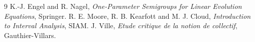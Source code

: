 \documentclass[11pt,a4paper]{article}
\begin{document}
\begin{thebibliography}{9}
 K.-J. Engel and R. Nagel, \emph{One-Parameter Semigroups for Linear Evolution Equations}, Springer.
 R. E. Moore, R. B. Kearfott and M. J. Cloud, \emph{Introduction to Interval Analysis}, SIAM.
 J. Ville, \emph{Etude critique de la notion de collectif}, Gauthier-Villars.
\end{thebibliography}
\end{document}
